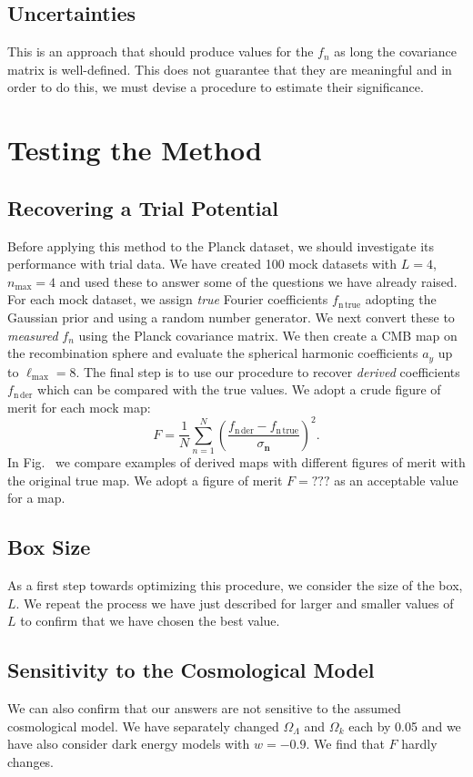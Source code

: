 \documentclass[useAMS,usenatbib,a4paper]{mn2e}
\begin{document}
\subsection{Uncertainties}
This is an approach that should produce values for the $f_n$ as long the covariance matrix is well-defined. This does not guarantee that they are meaningful and in order to do this, we must devise a procedure to estimate their significance.
\section{Testing the Method}
\subsection{Recovering a Trial Potential}
Before applying this method to the Planck dataset, we should investigate its performance with trial data. We have created 100 mock datasets with $L=4$, $n_\mathrm{max}=4$ and used these to answer some of the questions we have already raised. For each mock dataset, we assign {\it true} Fourier coefficients $f_\mathrm{n\,true}$ adopting the Gaussian prior and using a random number generator. We next convert these to {\it measured} $f_n$ using the Planck covariance matrix. We then create a CMB map on the recombination sphere and evaluate the spherical harmonic coefficients $a_y$ up to $\ell_\mathrm{max}=8$. The final step is to use our procedure to recover {\it derived} coefficients $f_\mathrm{n\,der}$ which can be compared with the true values. We adopt a crude  figure of merit for each mock map:
\begin{equation}
F=\frac1N\sum_{n=1}^N\left(\frac{f_\mathrm{n\,der}-f_\mathrm{n\,true}}{\sigma_{\mathbf n}}\right)^2.
\end{equation}
In Fig.~ we compare examples of derived maps with different figures of merit with the original true map. We adopt a figure of merit $F=???$ as an acceptable value for a map.
\subsection{Box Size}
As a first step towards optimizing this procedure, we consider the size of the box, $L$. We repeat the process we have just described for larger and smaller values of $L$ to confirm that we have chosen the best value. 
\subsection{Sensitivity to the Cosmological Model}
We can also confirm that our answers are not sensitive to the assumed cosmological model. We have separately changed $\Omega_\Lambda$ and $\Omega_k$ each by  0.05 and we have also consider dark energy models with $w=-0.9$. We find that $F$ hardly changes.
\end{document}
